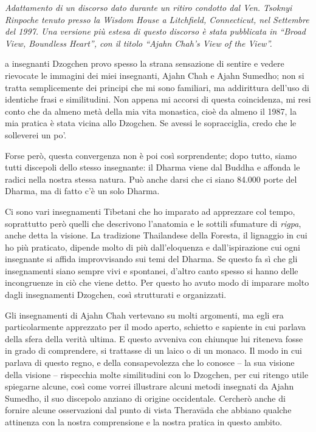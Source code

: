 
\textit{Adattamento di un discorso dato durante un ritiro condotto dal Ven. Tsoknyi Rinpoche tenuto presso la Wisdom House a Litchfield, Connecticut, nel Settembre del 1997. Una versione più estesa di questo discorso è stata pubblicata in ``Broad View, Boundless Heart'', con il titolo ``Ajahn Chah's View of the View''.}

\bigskip

\noindent{} a insegnanti Dzogchen provo spesso la strana sensazione di sentire e vedere rievocate le immagini dei miei insegnanti, Ajahn Chah e Ajahn Sumedho; non si tratta semplicemente dei principi che mi sono familiari, ma addirittura dell'uso di identiche frasi e similitudini. Non appena mi accorsi di questa coincidenza, mi resi conto che da almeno metà della mia vita monastica, cioè da almeno il 1987, la mia pratica è stata vicina allo Dzogchen. Se avessi le sopracciglia, credo che le solleverei un po'.

Forse però, questa convergenza non è poi così sorprendente; dopo tutto, siamo tutti discepoli dello stesso insegnante: il Dharma viene dal Buddha e affonda le radici nella nostra stessa natura. Può anche darsi che ci siano 84.000 porte del Dharma, ma di fatto c'è un solo Dharma. 

Ci sono vari insegnamenti Tibetani che ho imparato ad apprezzare col tempo, soprattutto però quelli che descrivono l'anatomia e le sottili sfumature di \textit{rigpa}, anche detta la visione. La tradizione Thailandese della Foresta, il lignaggio in cui ho più praticato, dipende molto di più dall'eloquenza e dall'ispirazione cui ogni insegnante si affida improvvisando sui temi del Dharma. Se questo fa sì che gli insegnamenti siano sempre vivi e spontanei, d'altro canto spesso si hanno delle incongruenze in ciò che viene detto. Per questo ho avuto modo di imparare molto dagli insegnamenti Dzogchen, così strutturati e organizzati.

Gli insegnamenti di Ajahn Chah vertevano su molti argomenti, ma egli era particolarmente apprezzato per il modo aperto, schietto e sapiente in cui parlava della sfera della verità ultima. E questo avveniva con chiunque lui riteneva fosse in grado di comprendere, si trattasse di un laico o di un monaco. Il modo in cui parlava di questo regno, e della consapevolezza che lo conosce – la sua visione della visione – rispecchia molte similitudini con lo Dzogchen, per cui ritengo utile spiegarne alcune, così come vorrei illustrare alcuni metodi insegnati da Ajahn Sumedho, il suo discepolo anziano di origine occidentale. Cercherò anche di fornire alcune osservazioni dal punto di vista Theravāda che abbiano qualche attinenza con la nostra comprensione e la nostra pratica in questo ambito.

